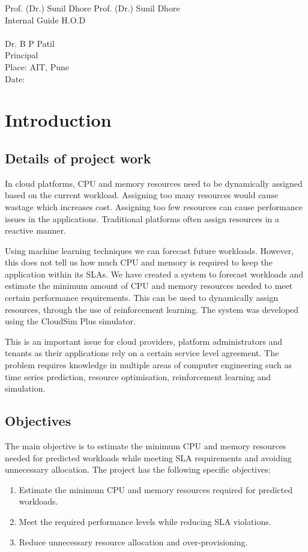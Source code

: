 \documentclass[12pt,a4paper]{report}
\begin{document}
\vspace{2cm}
\noindent
Prof. (Dr.) Sunil Dhore \hfill Prof. (Dr.) Sunil Dhore \\
Internal Guide \hfill H.O.D \\
\vspace{2cm} \\
Dr. B P Patil \hfill \\
Principal \hfill \\
Place: AIT, Pune \\
Date:

\tableofcontents
\listoffigures

\chapter{Introduction}
\section{Details of project work}
In cloud platforms, CPU and memory resources need to be dynamically assigned based on the current workload. Assigning too many resources would cause wastage which increases cost. Assigning too few resources can cause performance issues in the applications. Traditional platforms often assign resources in a reactive manner.

Using machine learning techniques we can forecast future workloads. However, this does not tell us how much CPU and memory is required to keep the application within its SLAs. We have created a system to forecast workloads and estimate the minimum amount of CPU and memory resources needed to meet certain performance requirements. This can be used to dynamically assign resources, through the use of reinforcement learning. The system was developed using the CloudSim Plus simulator.

This is an important issue for cloud providers, platform administrators and tenants as their applications rely on a certain service level agreement. The problem requires knowledge in multiple areas of computer engineering such as time series prediction, resource optimisation, reinforcement learning and simulation.

\lipsum[1-5] %

\section{Objectives}
The main objective is to estimate the minimum CPU and memory resources needed for predicted workloads while meeting SLA requirements and avoiding unnecessary allocation.
The project has the following specific objectives:
\begin{enumerate}
    \item Estimate the minimum CPU and memory resources required for predicted workloads.
    \item Meet the required performance levels while reducing SLA violations.
    \item Reduce unnecessary resource allocation and over-provisioning.
\end{enumerate}
\lipsum[6-8]
\end{document}
